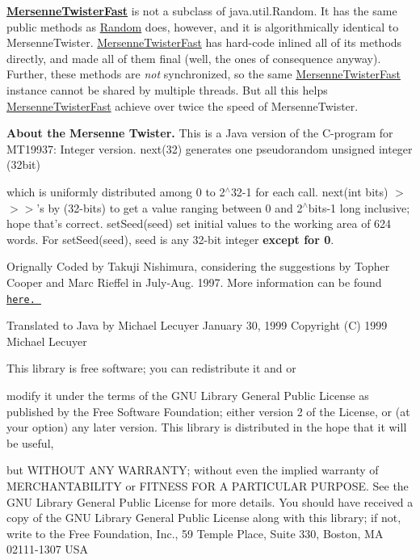 {\bfseries \hyperlink{classjenes_1_1utils_1_1_mersenne_twister_fast}{Mersenne\-Twister\-Fast}} is not a subclass of java.\-util.\-Random. It has the same public methods as \hyperlink{classjenes_1_1utils_1_1_random}{Random} does, however, and it is algorithmically identical to Mersenne\-Twister. \hyperlink{classjenes_1_1utils_1_1_mersenne_twister_fast}{Mersenne\-Twister\-Fast} has hard-\/code inlined all of its methods directly, and made all of them final (well, the ones of consequence anyway). Further, these methods are {\itshape not} synchronized, so the same \hyperlink{classjenes_1_1utils_1_1_mersenne_twister_fast}{Mersenne\-Twister\-Fast} instance cannot be shared by multiple threads. But all this helps \hyperlink{classjenes_1_1utils_1_1_mersenne_twister_fast}{Mersenne\-Twister\-Fast} achieve over twice the speed of Mersenne\-Twister.

{\bfseries About the Mersenne Twister. } This is a Java version of the C-\/program for M\-T19937\-: Integer version. next(32) generates one pseudorandom unsigned integer (32bit)

which is uniformly distributed among 0 to 2$^\wedge$32-\/1 for each call. next(int bits) $>$$>$$>$'s by (32-\/bits) to get a value ranging between 0 and 2$^\wedge$bits-\/1 long inclusive; hope that's correct. set\-Seed(seed) set initial values to the working area of 624 words. For set\-Seed(seed), seed is any 32-\/bit integer {\bfseries except for 0}.

Orignally Coded by Takuji Nishimura, considering the suggestions by Topher Cooper and Marc Rieffel in July-\/\-Aug. 1997. More information can be found \href{http://www.math.keio.ac.jp/matumoto/emt.html}{\tt here. }

Translated to Java by Michael Lecuyer January 30, 1999 Copyright (C) 1999 Michael Lecuyer 

This library is free software; you can redistribute it and or

modify it under the terms of the G\-N\-U Library General Public License as published by the Free Software Foundation; either version 2 of the License, or (at your option) any later version. This library is distributed in the hope that it will be useful,

but W\-I\-T\-H\-O\-U\-T A\-N\-Y W\-A\-R\-R\-A\-N\-T\-Y; without even the implied warranty of M\-E\-R\-C\-H\-A\-N\-T\-A\-B\-I\-L\-I\-T\-Y or F\-I\-T\-N\-E\-S\-S F\-O\-R A P\-A\-R\-T\-I\-C\-U\-L\-A\-R P\-U\-R\-P\-O\-S\-E. See the G\-N\-U Library General Public License for more details. You should have received a copy of the G\-N\-U Library General Public License along with this library; if not, write to the Free Foundation, Inc., 59 Temple Place, Suite 330, Boston, M\-A 02111-\/1307 U\-S\-A 

